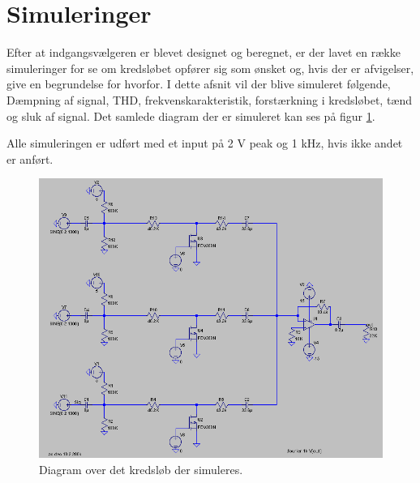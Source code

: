\section{Simuleringer}
Efter at indgangsvælgeren er blevet designet og beregnet, er der lavet en række simuleringer for se om kredsløbet opfører sig som ønsket og, hvis der er afvigelser, give en begrundelse for hvorfor. I dette afsnit vil der blive simuleret følgende, Dæmpning af signal, THD, frekvenskarakteristik, forstærkning i kredsløbet, tænd og sluk af signal. Det samlede diagram der er simuleret kan ses på figur \ref{diagram_simulering}. 


Alle simuleringen er udført med et input på 2 V peak og 1 kHz, hvis ikke andet er anført.

\begin{figure}[h]
\centering
\includegraphics[scale=0.4]{teknisk/indgangsvaelger/simulering/indgangvaelger_ltspice_diagram.png}
\caption{Diagram over det kredsløb der simuleres.}
\label{diagram_simulering}
\end{figure}

